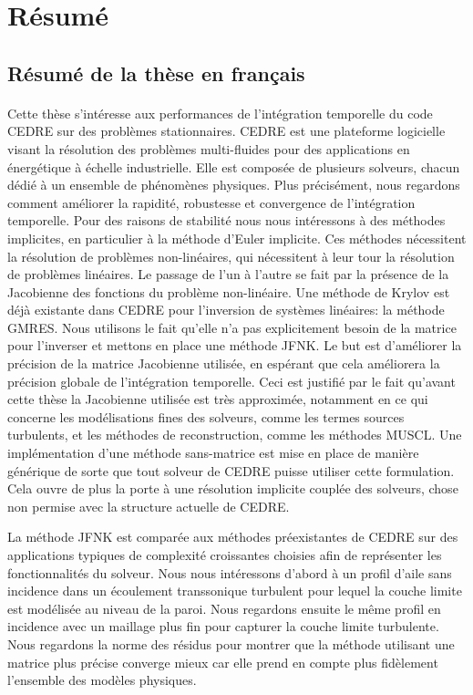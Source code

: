 \section{Résumé}

  \subsection{Résumé de la thèse en français}

    \paragraph{}
Cette thèse s'intéresse aux performances de l'intégration temporelle du code CEDRE sur des problèmes stationnaires.
CEDRE est une plateforme logicielle visant la résolution des problèmes multi-fluides pour des applications en énergétique à échelle industrielle.
Elle est composée de plusieurs solveurs, chacun dédié à un ensemble de phénomènes physiques.
Plus précisément, nous regardons comment améliorer la rapidité, robustesse et convergence de l’intégration temporelle.
Pour des raisons de stabilité nous nous intéressons à des méthodes implicites, en particulier à la méthode d'Euler implicite.
Ces méthodes nécessitent la résolution de problèmes non-linéaires, qui nécessitent à leur tour la résolution de problèmes linéaires.
Le passage de l'un à l'autre se fait par la présence de la Jacobienne des fonctions du problème non-linéaire.
Une méthode de Krylov est déjà existante dans CEDRE pour l'inversion de systèmes linéaires: la méthode GMRES.
Nous utilisons le fait qu'elle n'a pas explicitement besoin de la matrice pour l'inverser et mettons en place une méthode JFNK.
Le but est d'améliorer la précision de la matrice Jacobienne utilisée, en espérant que cela améliorera la précision globale de l'intégration temporelle.
Ceci est justifié par le fait qu'avant cette thèse la Jacobienne utilisée est très approximée, notamment en ce qui concerne les modélisations fines des solveurs, comme les termes sources turbulents, et les méthodes de reconstruction, comme les méthodes MUSCL.
Une implémentation d'une méthode sans-matrice est mise en place de manière générique de sorte que tout solveur de CEDRE puisse utiliser cette formulation.
Cela ouvre de plus la porte à une résolution implicite couplée des solveurs, chose non permise avec la structure actuelle de CEDRE.

La méthode JFNK est comparée aux méthodes préexistantes de CEDRE sur des applications typiques de complexité croissantes choisies afin de représenter les fonctionnalités du solveur.
Nous nous intéressons d'abord à un profil d'aile sans incidence dans un écoulement transsonique turbulent pour lequel la couche limite est modélisée au niveau de la paroi.
Nous regardons ensuite le même profil en incidence avec un maillage plus fin pour capturer la couche limite turbulente.
Nous regardons la norme des résidus pour montrer que la méthode utilisant une matrice plus précise converge mieux car elle prend en compte plus fidèlement l'ensemble des modèles physiques.

